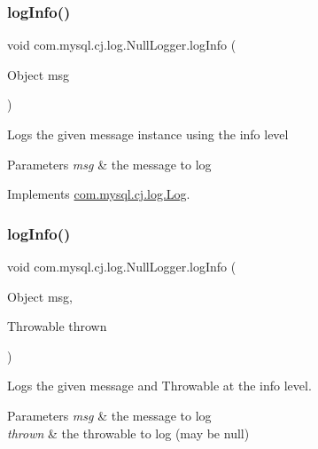 \subsubsection{\texorpdfstring{log\+Info()}{logInfo()}\hspace{0.1cm}{\footnotesize\ttfamily [1/2]}}
{\footnotesize\ttfamily void com.\+mysql.\+cj.\+log.\+Null\+Logger.\+log\+Info (\begin{DoxyParamCaption}\item[{Object}]{msg }\end{DoxyParamCaption})}

Logs the given message instance using the \textquotesingle{}info\textquotesingle{} level


\begin{DoxyParams}{Parameters}
{\em msg} & the message to log \\
\hline
\end{DoxyParams}


Implements \mbox{\hyperlink{interfacecom_1_1mysql_1_1cj_1_1log_1_1_log_a7f117433067520dd682da12ff9194f4b}{com.\+mysql.\+cj.\+log.\+Log}}.

\mbox{\label{classcom_1_1mysql_1_1cj_1_1log_1_1_null_logger_a0dc09cf6b7ae8266a850c79bc226e714}} 
\subsubsection{\texorpdfstring{log\+Info()}{logInfo()}\hspace{0.1cm}{\footnotesize\ttfamily [2/2]}}
{\footnotesize\ttfamily void com.\+mysql.\+cj.\+log.\+Null\+Logger.\+log\+Info (\begin{DoxyParamCaption}\item[{Object}]{msg,  }\item[{Throwable}]{thrown }\end{DoxyParamCaption})}

Logs the given message and Throwable at the \textquotesingle{}info\textquotesingle{} level.


\begin{DoxyParams}{Parameters}
{\em msg} & the message to log \\
\hline
{\em thrown} & the throwable to log (may be null) \\
\hline
\end{DoxyParams}


